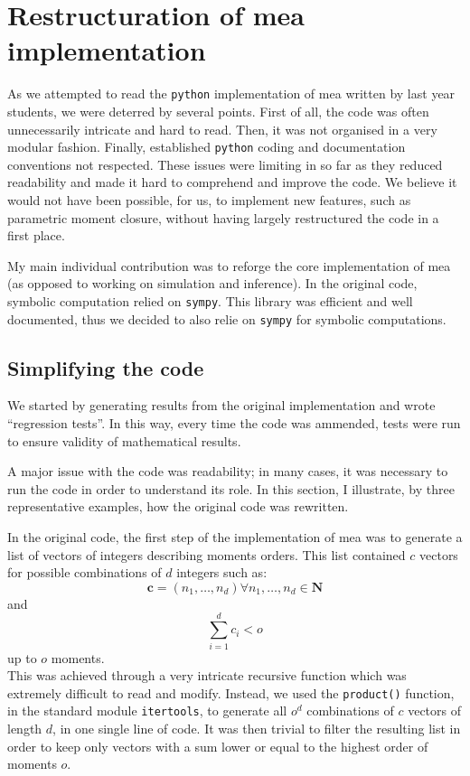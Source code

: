 \documentclass[11pt,a4paper]{article}
\newcommand{\py}{\texttt{python}}
\newcommand{\sympy}{\texttt{sympy}}
\newcommand{\citationneeded}[2][]{\todo[color=brown, fancyline, #1]{\textbf{Citation Needed:} #2}}
\begin{document}
\section{Restructuration of \acrlong{mea} implementation}
As we attempted to read the \py{} implementation of \acrshort{mea} written by last year students\cite{babtie_moment_2013},
we were deterred by several points.
First of all, the code was often unnecessarily intricate and hard to read.
Then, it was not organised in a very modular fashion.
Finally, established \py{} coding and documentation conventions\cite{_pep_????} not respected.
These issues were limiting in so far as they reduced readability and made it hard to comprehend and improve the code.
We believe it would not have been possible, for us, to implement new features, such as parametric moment closure,
without having largely restructured the code in a first place.

My main individual contribution was to reforge the core implementation of \acrshort{mea} (as opposed to working on simulation and inference).
In the original code, symbolic computation relied on \sympy{}\citationneeded{}.
This library was efficient and well documented, thus we decided to also relie on \sympy{} for symbolic computations.
 
\subsection{Simplifying the code}
We started by generating results from the original implementation and wrote ``regression tests''.
In this way, every time the code was ammended, tests were run to ensure validity of mathematical results.

A major issue with the code was readability; in many cases, it was necessary to run the code in order to understand its role.
In this section, I illustrate, by three representative examples, how the original code was rewritten.

In the original code, the first step of the implementation of \acrshort{mea} was to generate a list of vectors of integers describing moments orders.
This list contained $c$ vectors for possible combinations of $d$ integers such as:\\
\[\mathbf{c} =(n_1, \dots, n_d) \forall{n_1, \dots, n_d \in \mathbf{N}}\]
and\\
\[\sum_{i=1}^{d} c_i < o\]
up to $o$ moments.\\

This was achieved through a very intricate recursive function which was extremely difficult to read and modify.
Instead, we used the \texttt{product()} function, in the standard module \texttt{itertools},
to generate all $o^d$ combinations of $c$ vectors of length  $d$, in one single line of code.
It was then trivial to filter the resulting list in order to keep only vectors with a sum lower or equal to the highest order of moments $o$.
\end{document}

